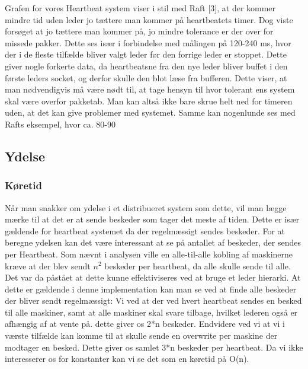\documentclass[a4paper,12pt]{article}
\begin{document}
Grafen for vores Heartbeat system viser i stil med Raft [3], at der kommer mindre tid uden leder jo tættere man kommer på heartbeatets timer.
Dog viste forsøget at jo tættere man kommer på, jo mindre tolerance er der over for missede pakker. Dette ses især i forbindelse med målingen på 120-240 ms, hvor der i de fleste tilfælde bliver valgt leder før den forrige leder er stoppet. Dette giver nogle forkerte data, da heartbeatsne fra den nye leder bliver buffet i den første leders socket, og derfor skulle den blot læse fra bufferen. Dette viser, at man nødvendigvis må være nødt til, at tage hensyn til hvor tolerant ens system skal være overfor pakketab. Man kan altså ikke bare skrue helt ned for timeren uden, at det kan give problemer med systemet. 
Samme kan nogenlunde ses med Rafts eksempel, hvor ca. 80-90%

\subsection{Ydelse}
\subsubsection{Køretid}
Når man snakker om ydelse i et distribueret system som dette, vil man lægge mærke til at det er at sende beskeder som tager det meste af tiden. Dette er især gældende for heartbeat systemet da der regelmæssigt sendes beskeder.
For at beregne ydelsen kan det være interessant at se på antallet af beskeder, der sendes per Heartbeat.
Som nævnt i analysen ville en alle-til-alle kobling af maskinerne kræve at der blev sendt $n^2$ beskeder per heartbeat, da alle skulle sende til alle. 
Det var da påstået at dette kunne effektiviseres ved at bruge et leder hierarki.
At dette er gældende i denne implementation kan man se ved at finde alle beskeder der bliver sendt regelmæssigt:
Vi ved at der ved hvert heartbeat sendes en besked til alle maskiner, samt at alle maskiner skal svare tilbage, hvilket lederen også er afhængig af at vente på. dette giver os 2*n beskeder. Endvidere ved vi at vi i værste tilfælde kan komme til at skulle sende en overwrite per maskine der modtager en besked. Dette giver os samlet 3*n beskeder per heartbeat. Da vi ikke interesserer os for konstanter kan vi se det som en køretid på O(n).
\end{document}
